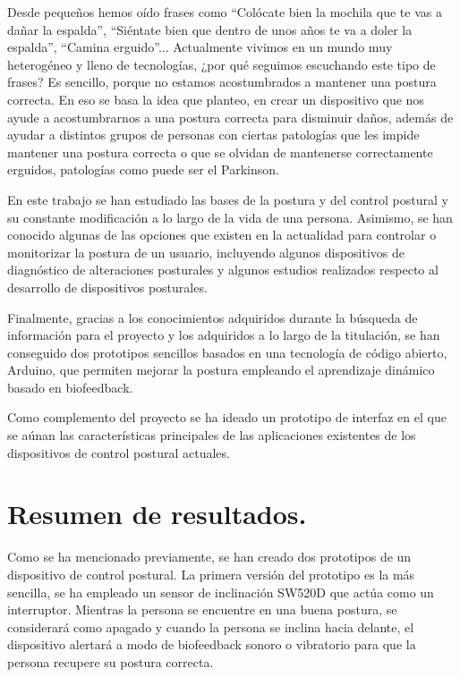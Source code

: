
Desde pequeños hemos oído frases como ``Colócate bien la mochila que te vas a dañar la espalda'', ``Siéntate bien que dentro de unos años te va a doler la espalda'', ``Camina erguido''... Actualmente vivimos en un mundo muy heterogéneo y lleno de tecnologías, ¿por qué seguimos escuchando este tipo de frases? Es sencillo, porque no estamos acostumbrados a mantener una postura correcta. En eso se basa la idea que planteo, en crear un dispositivo que nos ayude a acostumbrarnos a una postura correcta para disminuir daños, además de ayudar a distintos grupos de personas con ciertas patologías que les impide mantener una postura correcta o que se olvidan de mantenerse correctamente erguidos, patologías como puede ser el Parkinson. 

En este trabajo se han estudiado las bases de la postura y del control postural y su constante modificación a lo largo de la vida de una persona. Asimismo, se han conocido algunas de las opciones que existen en la actualidad para controlar o monitorizar la postura de un usuario, incluyendo algunos dispositivos de diagnóstico de alteraciones posturales y algunos estudios realizados respecto al desarrollo de dispositivos posturales.

Finalmente, gracias a los conocimientos adquiridos durante la búsqueda de información para el proyecto y los adquiridos a lo largo de la titulación, se han conseguido dos prototipos sencillos basados en una tecnología de código abierto, Arduino, que permiten mejorar la postura empleando el aprendizaje dinámico basado en biofeedback. 

Como complemento del proyecto se ha ideado un prototipo de interfaz en el que se aúnan las características principales de las aplicaciones existentes de los dispositivos de control postural actuales.


\section{Resumen de resultados.}

Como se ha mencionado previamente, se han creado dos prototipos de un dispositivo de control postural. La primera versión del prototipo es la más sencilla, se ha empleado un sensor de inclinación SW520D que actúa como un interruptor. Mientras la persona se encuentre en una buena postura, se considerará como apagado y cuando la persona se inclina hacia delante, el dispositivo alertará a modo de biofeedback sonoro o vibratorio para que la persona recupere su postura correcta. 

